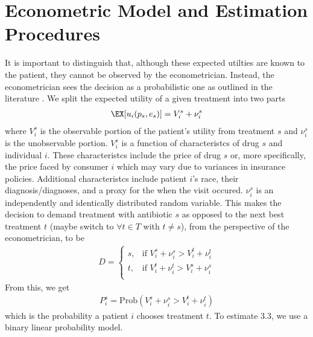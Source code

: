 \section{Econometric Model and Estimation Procedures}
\indent It is important to distinguish that, although these expected utilties are known to the patient, they cannot be observed by the econometrician. Instead, the econometrician sees the decision as a probabilistic one as outlined in the literature \cite{train_discrete_nodate, templeton_household_2008}. We split the expected utility of a given treatment into two parts
\begin{eqnarray}
\EX[u_i(p_s,e_s)] = V_i^s + \nu_i^s
\end{eqnarray}
where $V_i^s$ is the observable portion of the patient's utility from treatment $s$ and $\nu_i^s$ is the unobservable portion. $V_i^s$ is a function of characteristcs of drug $s$ and individual $i$. These characteristcs include the price of drug $s$ or, more specifically, the price faced by consumer $i$ which may vary due to variances in insurance policies. Additional characteristcs include patient $i$'s race, their diagnosis/diagnoses, and a proxy for the when the visit occured. $\nu_i^s$ is an independently and identically distributed random variable. This makes the decision to demand treatment with antibiotic $s$ as opposed to the next best treatment $t$ (maybe switch to $\forall t \in T$ with $t \neq s$), from the perspective of the econometrician, to be
\begin{eqnarray}
  D =
  \begin{cases}
                                   s, & \text{if }V_i^s + \nu_i^s > V_i^t + \nu_i^t \\
                                   t, & \text{if }V_i^t + \nu_i^t > V_i^s + \nu_i^s \\
  \end{cases}
\end{eqnarray}
From this, we get
\begin{eqnarray}
P_i^s = \text{Prob}(V_i^s + \nu_i^s > V_i^t + \nu_i^t)
\end{eqnarray}
which is the probability a patient $i$ chooses treatment $t$. To estimate 3.3, we use a binary linear probability model.